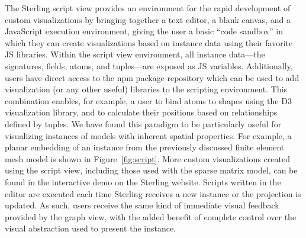 \documentclass[runningheads]{llncs}
\begin{document}
The Sterling script view provides an environment for the rapid development of custom visualizations by bringing together a text editor, a blank canvas, and a JavaScript execution environment, giving the user a basic ``code sandbox'' in which they can create visualizations based on instance data using their favorite JS libraries.
Within the script view environment, all instance data---the signatures, fields, atoms, and tuples---are exposed as JS variables. 
Additionally, users have direct access to the npm package repository which can be used to add visualization (or any other useful) libraries to the scripting environment.
This combination enables, for example, a user to bind atoms to shapes using the D3 visualization library, and to calculate their positions based on relationships defined by tuples.
We have found this paradigm to be particularly useful for visualizing instances of models with inherent spatial properties.
For example, a planar embedding of an instance from the previously discussed finite element mesh model is shown in Figure~\ref{fig:script}. More custom visualizations created using the script view, including those used with the sparse matrix model, can be found in the interactive demo on the Sterling website.
Scripts written in the editor are executed each time Sterling receives a new instance or the projection is updated. 
As such, users receive the same kind of immediate visual feedback provided by the graph view, with the added benefit of complete control over the visual abstraction used to present the instance.
\end{document}

